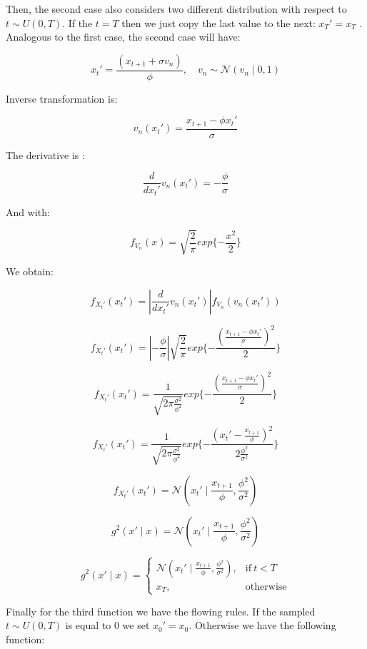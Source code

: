 \documentclass[]{article}
\begin{document}
	
	
	Then, the second case also considers two different distribution with respect to $t \sim U(0,T)$. If the $t = T$ then we just copy the last value to the next: $x_T' = x_T$ .
	Analogous to the first case, the second case will have: 
	
	$$ x_t' =  \frac{( x_{t+1} + \sigma v_n)}{\phi}  , \quad v_n \sim \mathcal{N}(v_n \mid 0,1) $$
	
	Inverse transformation is:
	
	$$ v_n(x_t') = \frac{x_{t+1} - \phi x_t'}{\sigma}  $$
	
	The derivative is :
	
	$$ \frac{d}{d x_t'} v_n(x_t') = -\frac{\phi}{\sigma} $$
	
	And with:
	
	$$  f_{V_n}( x ) = \sqrt{\frac{2}{\pi}} exp\{ -\frac{x^2}{2} \} $$
	
	We obtain:
	
	$$ f_{X_t'}(x_t') = \left | \frac{d}{dx_t'} v_n(x_t') \right | f_{V_n}(v_n(x_t')) $$
	
	$$ f_{X_t'}(x_t') = \left | -\frac{\phi}{\sigma} \right | \sqrt{\frac{2}{\pi}} exp\{ -\frac{ (\frac{x_{t+1} - \phi x_t'}{\sigma})^2}{2} \}$$
	
	$$ f_{X_t'}(x_t') =  \frac{1}{ \sqrt{2 \pi \frac{\sigma^2}{\phi^2} }} exp\{ -\frac{ (\frac{x_{t+1} - \phi x_t'}{\sigma})^2}{2} \}$$
	
	$$ f_{X_t'}(x_t') =  \frac{1}{ \sqrt{2 \pi \frac{\sigma^2}{\phi^2} }} exp\{ -\frac{ ( x_t' - \frac{x_{t+1}}{\phi} )^2}{2 \frac{\phi^2}{\sigma^2}} \}$$
	
	$$ f_{X_t'}(x_t') = \mathcal{N}(x_t' \mid \frac{x_{t+1}}{\phi}, \frac{\phi^2}{\sigma^2}) $$
	
	
	$$ g^2(x' \mid x) = \mathcal{N}(x_t' \mid \frac{x_{t+1}}{\phi}, \frac{\phi^2}{\sigma^2}) $$
	
	
	
	\begin{equation}
	g^2(x' \mid x)=
	\begin{cases}
	\mathcal{N}(x_t' \mid \frac{x_{t+1}}{\phi}, \frac{\phi^2}{\sigma^2}), & \text{if}\ t<T \\
	x_T , & \text{otherwise}
	\end{cases}
	\end{equation}
	
	Finally for the third function we have the flowing rules. If the sampled $t \sim U(0,T)$ is equal to $0$ we set $x_0' = x_0$. Otherwise we have the following function:
	
\end{document}
